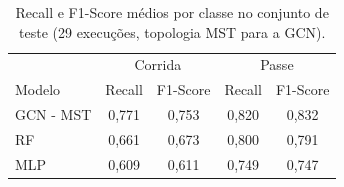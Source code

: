 \begin{table}[htbp]
    \centering
    \caption{Recall e F1-Score m\'edios por classe no conjunto de teste (29 execu\c{c}\~oes, topologia MST para a GCN).}
    \label{tab:metricas_por_classe}
    \begin{tabular}{lcccc}
        \hline
        & \multicolumn{2}{c}{Corrida} & \multicolumn{2}{c}{Passe} \\
        Modelo & Recall & F1-Score & Recall & F1-Score \\
        \hline
        GCN - MST & 0,771 & 0,753 & 0,820 & 0,832 \\
        RF & 0,661 & 0,673 & 0,800 & 0,791 \\
        MLP & 0,609 & 0,611 & 0,749 & 0,747 \\
        \hline
    \end{tabular}
\end{table}
